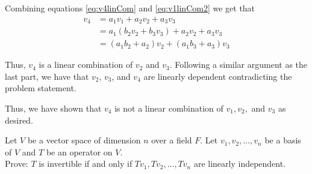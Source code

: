 \documentclass[answers]{exam}
\begin{document}
\begin{questions}
\begin{parts}
\begin{subparts}
\begin{solution}
                Combining equations \eqref{eq:v4linCom} and \eqref{eq:v1linCom2} we get that
                \begin{align*}
                    v_4 &= a_1v_1 + a_2v_2 + a_3v_3 \\
                    &= a_1\left(b_2v_2 + b_3v_3\right) + a_2v_2 + a_3v_3 \\
                    &= \left(a_1b_2 + a_2\right)v_2 + \left(a_1b_3 + a_3\right)v_3
                \end{align*}

                Thus, $v_4$ is a linear combination of $v_2$ and $v_3$. Following a similar argument as the last
                part, we have that $v_2$, $v_3$, and $v_4$ are linearly dependent contradicting the problem
                statement. 

                Thus, we have shown that $v_4$ is not a linear combination of $v_1,v_2,$ and $v_3$ as desired.
            \end{solution}
        \end{subparts}
        \iffalse %
        \part Find $10$ vectors in $\R^3$ so that any three of them for a basis. Justify your answer.
        \fi
    \end{parts}
    \question Let $V$ be a vector space of dimension $n$ over a field $F$. Let $v_1,v_2,\dots,v_n$ be a basis of $V$ and $T$ be an operator on $V$. \\
    Prove: $T$ is invertible if and only if $Tv_1,Tv_2,\dots,Tv_n$ are linearly independent.
\end{questions}
\end{document}
